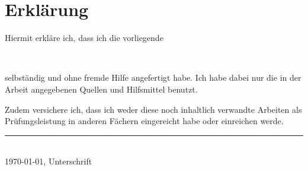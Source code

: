 \section*{Erklärung}
Hiermit erkläre ich, dass ich die vorliegende \art \\[.5cm]
\begin{center}
\glqq{}\titel\grqq{}\\[1cm]
\end{center}
selbständig und ohne fremde Hilfe angefertigt habe. Ich habe dabei nur die in der Arbeit angegebenen Quellen und Hilfsmittel benutzt.

Zudem versichere ich, dass ich weder diese noch inhaltlich verwandte Arbeiten als Prüfungsleistung in anderen Fächern eingereicht habe oder einreichen werde.\\[2cm]
\rule {6cm}{0.2mm}\\
\today{}, Unterschrift\\
\clearpage